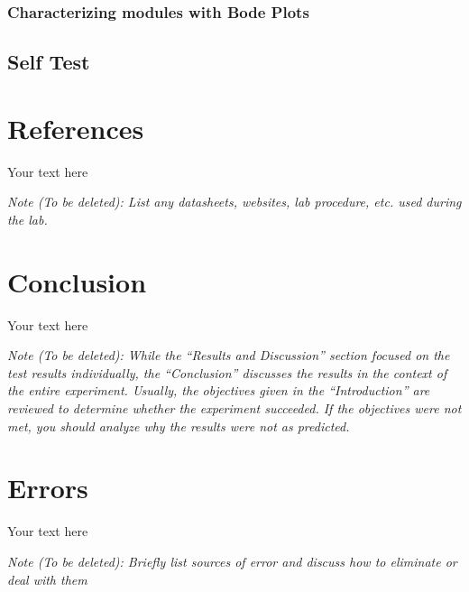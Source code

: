 \documentclass[10pt]{article}
\begin{document}
\subsubsection{Characterizing modules with Bode Plots}

\subsection{Self Test}
	


\medskip

\section{References}

Your text here

\medskip

\textit{Note (To be deleted): List any datasheets, websites, lab procedure, etc. used during the lab.}

\section{Conclusion}

Your text here

\medskip

\textit{Note (To be deleted): While the ``Results and Discussion'' section focused on the test results individually, the ``Conclusion'' discusses the results in the context of the entire experiment. Usually, the objectives given in the ``Introduction'' are reviewed to determine whether the experiment succeeded. If the objectives were not met, you should analyze why the results were not as predicted.}

\section{Errors}

Your text here

\medskip

\textit{Note (To be deleted): Briefly list sources of error and discuss how to eliminate or deal with them}
\end{document}
